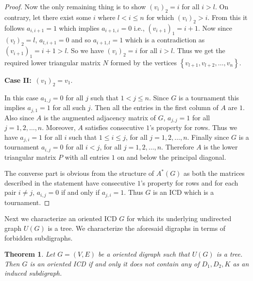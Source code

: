 \documentclass{article}
\newtheorem{thm}{Theorem}[section]
\theoremstyle{definition}
\numberwithin{equation}{section}
\newcommand{\set}[1]{\left\{#1\right\}}
\begin{document}
\begin{proof}
\vspace{0.5em}\noindent
Now the only remaining thing is to show ${(v_{i})}_{2}=i$ for all $i>l$. On contrary, let there exist some $i$ where $l<i\leq n$ for which ${(v_{i})}_{2}>i$. From this it follows $a_{i,i+1}=1$ which implies $a_{i+1,i}=0$ i.e., ${(v_{i+1})}_{1}=i+1$. Now since $(v_l)_2=l$, $a_{l,i+1}=0$ and so $a_{i+1,l}=1$ which is a contradiction as ${(v_{i+1})}_{1}=i+1>l$. So we have ${(v_{i})}_{2}=i$ for all $i>l$. Thus we get the required lower triangular matrix $N$ formed by the vertices $\set{v_{l+1},v_{l+2},\ldots,v_{n}}$.

\vspace{0.25em}\noindent 
{\bf Case II:}\ ${(v_{1})}_{2}=v_{1}$. 

\vspace{0.25em}\noindent
In this case $a_{1,j}=0$ for all $j$ such that $1< j\leq n$. Since $G$ is a tournament this implies $a_{j,1}=1$ for all such $j$. Then all the entries in the first column of $A$ are $1$. Also since $A$ is the augmented adjacency matrix of $G$, $a_{j,j}=1$ for all $j=1,2,\ldots,n$. Moreover, $A$ satisfies consecutive $1$'s property for rows. Thus we have $a_{j,i}=1$ for all $i$ such that $1\leq i\leq j$, for all $j=1,2,\ldots,n$. Finally since $G$ is a tournament $a_{i,j}=0$ for all $i<j$, for all $j=1,2,\ldots,n$. Therefore $A$ is the lower triangular matrix $P$ with all entries $1$ on and below the principal diagonal. 

\vspace{0.25em}\noindent 
The converse part is obvious from the structure of $A^{*}(G)$ as both the matrices described in the statement have consecutive $1$'s property for rows and for each pair $i\neq j$, $a_{i,j}=0$ if and only if $a_{j,i}=1$. Thus $G$ is an ICD which is a tournament.
\end{proof}

\noindent Next we characterize an oriented ICD $G$ for which its underlying undirected graph $U(G)$ is a tree. We characterize the aforesaid digraphs in terms of forbidden subdigraphs. 


\begin{thm}\label{d2}
Let $G=(V,E)$ be a oriented digraph such that $U(G)$ is a tree. Then $G$ is an oriented ICD if and only it does not contain any of $D_{1}, D_{2},K$ as an induced subdigraph.
\end{thm}
\end{document}
